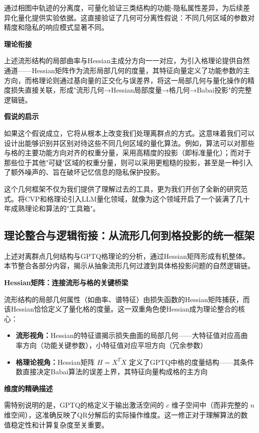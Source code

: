 \documentclass[letterpaper,twocolumn,10pt]{article}
\begin{document}
通过相图中轨迹的分离度，可量化验证三类结构的功能-隐私属性差异，为后续差异化量化提供实验依据。这直接验证了几何可分离性假说：不同几何区域的参数对精度和隐私的响应模式显著不同。

\textbf{理论衔接}

上述流形结构的局部曲率与Hessian主成分方向一一对应，为引入格理论提供自然通道——Hessian矩阵作为流形局部几何的度量，其特征向量定义了功能参数的主方向，而格理论则通过基向量的正交化与误差界，将这一局部几何与量化操作的精度损失直接关联，形成"流形几何→Hessian局部度量→格几何→Babai投影"的完整逻辑链。

\textbf{假说的启示}

如果这个假说成立，它将从根本上改变我们处理离群点的方式。这意味着我们可以设计出能够识别并区别对待这些不同几何区域的量化算法。例如，算法可以对那些与格的主要功能方向对齐的权重分量，采用高精度的投影（即标准量化）；而对于那些位于其他"可疑"区域的权重分量，则可以采用更粗糙的投影，甚至是一种引入了额外噪声的、旨在破坏记忆信息的隐私保护投影。

这个几何框架不仅为我们提供了理解过去的工具，更为我们开创了全新的研究范式。将CVP和格理论引入LLM量化领域，就像为这个领域开启了一个装满了几十年成熟理论和算法的"工具箱"。

\subsection{理论整合与逻辑衔接：从流形几何到格投影的统一框架}

上述对离群点几何结构与GPTQ格理论的分析，通过Hessian矩阵形成有机整体。本节整合各部分内容，揭示从抽象流形几何过渡到具体格投影问题的自然逻辑链。

\textbf{Hessian矩阵：连接流形与格的关键桥梁}

流形结构的局部几何属性（如曲率、谱特征）由损失函数的Hessian矩阵捕获，而该Hessian恰恰定义了量化格的度量。这一双重角色使Hessian成为理论整合的核心：

\begin{itemize}
\item \textbf{流形视角：}Hessian的特征谱揭示损失曲面的局部几何——大特征值对应高曲率方向（功能关键参数），小特征值对应平坦方向（冗余参数）

\item \textbf{格理论视角：}Hessian矩阵 $H = X^T X$ 定义了GPTQ中格的度量结构——其条件数直接决定Babai算法的误差上界，其特征向量构成格的主方向
\end{itemize}

\textbf{维度的精确描述}

需特别说明的是，GPTQ的格定义于输出激活空间的 $c$ 维子空间中（而非完整的 $n$ 维空间），这准确反映了QR分解后的实际操作维度。这一修正对于理解算法的数值稳定性和计算复杂度至关重要。
\end{document}
